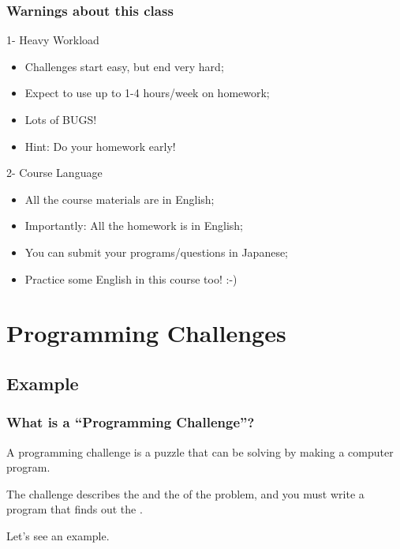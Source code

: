 \documentclass{beamer}
\begin{document}
\begin{frame}
  \frametitle{Warnings about this class}
  \begin{alertblock}{1- Heavy Workload}
    \begin{itemize}
    \item Challenges start easy, but end very hard;
    \item Expect to use up to 1-4 hours/week on homework;
    \item Lots of BUGS!

      \bigskip

    \item Hint: Do your homework early!
    \end{itemize}
  \end{alertblock}

  \begin{alertblock}{2- Course Language}
    \begin{itemize}
    \item All the course materials are in English;
    \item Importantly: All the homework is in English;
    \item You can submit your programs/questions in Japanese;

      \bigskip

    \item Practice some English in this course too! :-)
    \end{itemize}
  \end{alertblock}

\end{frame}

\section{Programming Challenges}
\subsection{Example}

\begin{frame}
  \frametitle{What is a ``Programming Challenge''?}

  A programming challenge is a puzzle that can be solving by making a
  computer program.

  \bigskip

  The challenge describes the  and the
   of the problem, and you must write a program that
  finds out the .

  \bigskip

  Let's see an example.
  
\end{frame}
\end{document}
